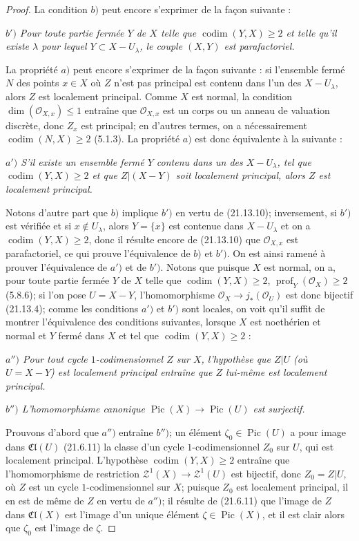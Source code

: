 \begin{proof}
La condition $b)$ peut encore s'exprimer de la façon suivante :

\emph{$b')$ Pour toute partie fermée $Y$ de $X$ telle que
$\operatorname{codim}(Y,X)\geq2$ et telle qu'il existe $\lambda$ pour lequel
$Y\subset X-U_\lambda$, le couple $(X,Y)$ est parafactoriel.}

La propriété $a)$ peut encore s'exprimer de la façon suivante : si l'ensemble fermé
$N$ des points $x\in X$ où $Z$ n'est pas principal est contenu dans l'un des
$X-U_\lambda$, alors $Z$ est localement principal. Comme $X$ est normal, la condition
$\dim(\mathcal O_{X,x})\leq1$ entraîne que $\mathcal O_{X,x}$ est un corps ou un
anneau de valuation discrète, donc $Z_x$ est principal; en d'autres termes, on a
nécessairement $\operatorname{codim}(N,X)\geq2$ (5.1.3). La propriété $a)$ est donc
équivalente à la suivante :

\emph{$a')$ S'il existe un ensemble fermé $Y$ contenu dans un des $X-U_\lambda$, tel
que $\operatorname{codim}(Y,X)\geq2$ et que $Z|(X-Y)$ soit localement principal,
alors $Z$ est localement principal.}

Notons d'autre part que $b)$ implique $b')$ en vertu de (21.13.10); inversement, si
$b')$ est vérifiée et si $x\notin U_\lambda$, alors $Y=\{x\}$ est contenue dans
$X-U_\lambda$ et on a $\operatorname{codim}(Y,X)\geq2$, donc il résulte encore de
(21.13.10) que $\mathcal O_{X,x}$ est parafactoriel, ce qui prouve l'équivalence de
$b)$ et $b')$. On est ainsi ramené à prouver l'équivalence de $a')$ et de $b')$.
Notons que puisque $X$ est normal, on a, pour toute partie fermée $Y$ de $X$ telle que
$\operatorname{codim}(Y,X)\geq2$, $\operatorname{prof}_Y(\mathcal O_X)\geq2$
(5.8.6); si l'on pose $U=X-Y$, l'homomorphisme
$\mathcal O_X\to j_*(\mathcal O_U)$ est donc bijectif (21.13.4); comme les conditions
$a')$ et $b')$ sont locales, on voit qu'il suffit de montrer l'équivalence des
conditions suivantes, lorsque $X$ est noethérien et normal et $Y$ fermé dans $X$ et
tel que $\operatorname{codim}(Y,X)\geq2$ :

\emph{$a'')$ Pour tout cycle $1$-codimensionnel $Z$ sur $X$, l'hypothèse que $Z|U$
(où $U=X-Y$) est localement principal entraîne que $Z$ lui-même est localement
principal.}

\emph{$b'')$ L'homomorphisme canonique
$\operatorname{Pic}(X)\to\operatorname{Pic}(U)$ est surjectif.}

Prouvons d'abord que $a'')$ entraîne $b'')$; un élément
$\zeta_0\in\operatorname{Pic}(U)$ a pour image dans $\mathfrak{Cl}(U)$ (21.6.11) la
classe d'un cycle $1$-codimensionnel $Z_0$ sur $U$, qui est localement principal.
L'hypothèse $\operatorname{codim}(Y,X)\geq2$ entraîne que l'homomorphisme de
restriction $\mathscr Z^1(X)\to\mathscr Z^1(U)$ est bijectif, donc $Z_0=Z|U$, où $Z$
est un cycle $1$-codimensionnel sur $X$; puisque $Z_0$ est localement principal, il en
est de même de $Z$ en vertu de $a'')$; il résulte de (21.6.11) que l'image de $Z$ dans
$\mathfrak{Cl}(X)$ est l'image d'un unique élément $\zeta\in\operatorname{Pic}(X)$,
et il est clair alors que $\zeta_0$ est l'image de $\zeta$.


\end{proof}
